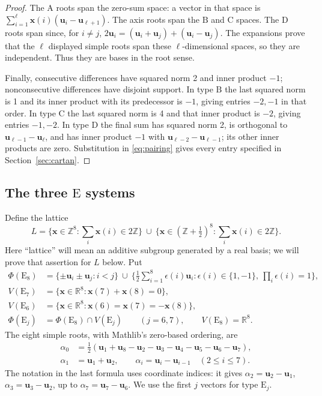 \documentclass[11pt]{amsart}
\newcommand\ints{{\mathbb Z}}
\newcommand\re{{\mathbb R}}%
\newcommand\Zu{{\mathbf u}}
\newcommand\Zx{{\mathbf x}}
\theoremstyle{definition}
\newcommand{\typ}[1]{\mathrm{#1}}
\begin{document}
\begin{proof}
The $\typ A$ roots span the zero-sum space: a vector in that space is
$\sum_{i=1}^{\ell}\Zx(i)(\Zu_i-\Zu_{\ell+1})$.
The axis roots span the $\typ B$ and $\typ C$ spaces. The $\typ D$ roots
span since, for $i\ne j$,
$2\Zu_i=(\Zu_i+\Zu_j)+(\Zu_i-\Zu_j)$.
The expansions prove that the $\ell$ displayed simple roots span these
$\ell$-dimensional spaces, so they are independent. Thus they are
bases in the root sense.

Finally, consecutive differences have squared norm 2 and inner product
$-1$; nonconsecutive differences have disjoint support. In type $\typ B$
the last squared norm is 1 and its inner product with its predecessor is
$-1$, giving entries $-2,-1$ in that order. In type $\typ C$ the last
squared norm is 4 and that inner product is $-2$, giving entries $-1,-2$.
In type $\typ D$ the final sum has squared norm 2, is orthogonal to
$\Zu_{\ell-1}-\Zu_\ell$, and has inner product $-1$ with
$\Zu_{\ell-2}-\Zu_{\ell-1}$; its other inner products are zero.
Substitution in \eqref{eq:pairing} gives every entry specified in
Section~\ref{sec:cartan}.
\end{proof}

\subsection{\texorpdfstring{The three $\typ E$ systems}{The three E systems}}

Define the lattice
\begin{equation}\label{eq:E-lattice}
 L=\{\Zx\in\ints^8:\textstyle\sum_i\Zx(i)\in2\ints\}
 \ \cup\
 \{\Zx\in(\ints+\tfrac12)^8:\textstyle\sum_i\Zx(i)\in2\ints\}.
\end{equation}
Here ``lattice'' will mean an additive subgroup generated by a real basis;
we will prove that assertion for $L$ below. Put
\begin{align*}
 \Phi(\typ E_8)&=\{\pm\Zu_i\pm\Zu_j:i<j\}\ \cup\
 \{\tfrac12\textstyle\sum_{i=1}^8\epsilon(i)\Zu_i:
       \epsilon(i)\in\{1,-1\},\ \prod_i\epsilon(i)=1\},\\
 V(\typ E_7)&=\{\Zx\in\re^8:\Zx(7)+\Zx(8)=0\},\\
 V(\typ E_6)&=\{\Zx\in\re^8:\Zx(6)=\Zx(7)=-\Zx(8)\},\\
 \Phi(\typ E_j)&=\Phi(\typ E_8)\cap V(\typ E_j)\qquad(j=6,7),
 \qquad V(\typ E_8)=\re^8.
\end{align*}
The eight simple roots, with Mathlib's zero-based ordering, are
\begin{equation}\label{eq:E-base}
 \begin{split}
 \alpha_0&=\tfrac12(\Zu_1+\Zu_8-\Zu_2-\Zu_3-\Zu_4-\Zu_5-\Zu_6-\Zu_7),\\
 \alpha_1&=\Zu_1+\Zu_2,\qquad
 \alpha_i=\Zu_i-\Zu_{i-1}\quad(2\leq i\leq7).
 \end{split}
\end{equation}
The notation in the last formula uses coordinate indices: it gives
$\alpha_2=\Zu_2-\Zu_1$, $\alpha_3=\Zu_3-\Zu_2$, up to
$\alpha_7=\Zu_7-\Zu_6$. We use the first $j$ vectors for type $\typ E_j$.
\end{document}
